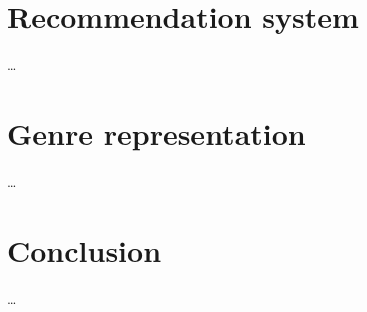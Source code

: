 \documentclass[10pt,twoside,slovak,a4paper]{article}
\begin{document}
\section{Recommendation system}\label{recommendationsystem}
\dots

\section{Genre representation}\label{genre}
\dots

\section{Conclusion}\label{conclusion} %
\dots




\end{document}
